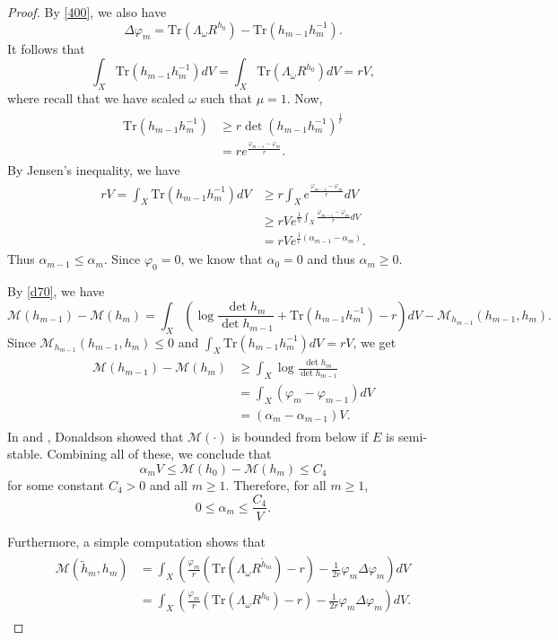 \documentclass[11pt]{amsart}
\numberwithin{equation}{section}
\theoremstyle{remark}
\renewcommand{\phi}{\varphi}
\newcommand{\wt}{\widetilde}
\newcommand{\M}{{\mathcal M}}
\newcommand{\lb}{\left (}
\newcommand{\rb}{\right )}
\newcommand{\ga}{\alpha}
\newcommand{\tr}{\text{Tr}}
\begin{document}
\begin{proof}
By \eqref{400}, we also have
\[
\Delta \phi_m=\tr \lb \Lambda_\omega R^{h_0}\rb-\tr\lb h_{m-1}h_m^{-1}\rb.
\]
It follows that
\[
\int_X \tr\lb h_{m-1}h_m^{-1}\rb dV=\int_X \tr\lb\Lambda_\omega R^{h_0}\rb dV=rV,
\]
where recall that we have scaled $\omega$ such that $\mu=1$. Now,
\begin{align*}
	\begin{split}
\tr\lb h_{m-1}h_m^{-1}\rb & \geq r \det \lb h_{m-1}h_m^{-1}\rb^{\frac 1r}\\
& =re^{\frac{\phi_{m-1}-\phi_m}{r}}.
\end{split}
\end{align*}
By Jensen's inequality, we have
\begin{align*}
	\begin{split}
rV  =\int_X \tr\lb h_{m-1}h_m^{-1}\rb dV & \geq r \int_X e^{\frac{\phi_{m-1}-\phi_m}{r}} dV \\
& \geq rV e^{\frac 1V\int_X \frac{\phi_{m-1}-\phi_m}{r}dV}\\
& =rV e^{\frac{1}r (\ga_{m-1}-\ga_m)}.
\end{split}
\end{align*}
Thus $\ga_{m-1}\leq\ga_m$. Since $\phi_0=0$, we know that $\ga_0=0$ and thus $\ga_m\geq 0$.

By \eqref{d70}, we have
\[
\M\lb h_{m-1}\rb-\M\lb h_{m}\rb=\int_X \lb \log\frac{\det h_m}{\det h_{m-1}}+\tr\lb h_{m-1}h_m^{-1}\rb -r\rb dV-\M_{h_{m-1}}\lb h_{m-1}, h_m\rb.
\]
Since $\M_{h_{m-1}}\lb h_{m-1}, h_m\rb\leq 0$ and $\int_X \tr\lb h_{m-1}h_m^{-1}\rb dV=rV$, we get
\begin{align*}
	\begin{split}
\M\lb h_{m-1}\rb-\M\lb h_{m}\rb & \geq \int_X  \log\frac{\det h_m}{\det h_{m-1}}\\
& =\int_X \lb \phi_m-\phi_{m-1}\rb dV \\
& =\lb \ga_m-\ga_{m-1}\rb V.
\end{split}
\end{align*}
In \cite{sd1} and \cite{sd2}, Donaldson showed that $\M (\cdot) $ is bounded from below if $E$ is semi-stable. Combining all of these, we conclude that
\[
\ga_m V\leq \M\lb h_{0}\rb-\M\lb h_{m}\rb \leq C_4
\]
for some constant $C_4>0$ and all $m\geq 1$. Therefore, for all $m\geq 1$,
\[0\leq \ga_m\leq \frac{C_4}{V}.\]

Furthermore, a simple computation shows that
\begin{align*}
\begin{split}
\M\lb \wt h_m,h_m\rb & =\int_X \lb\frac{\phi_m}{r}\lb \tr(\Lambda_\omega R^{\wt h_m})-r\rb-\frac{1}{2r} \phi_m\Delta\phi_m\rb dV\\
& =\int_X \lb\frac{\phi_m}{r}\lb \tr(\Lambda_\omega R^{ h_0})-r\rb-\frac{1}{2r} \phi_m\Delta\phi_m\rb dV.
\end{split}
\end{align*}


\end{proof}
\end{document}
